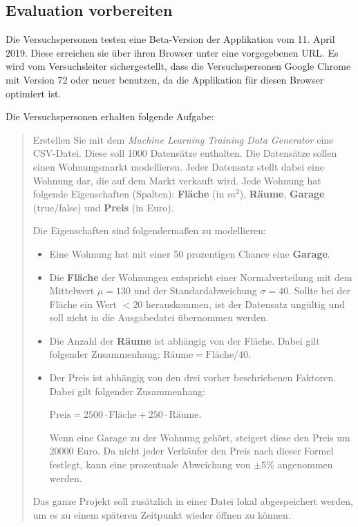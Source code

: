 \subsection{Evaluation vorbereiten}

Die Versuchspersonen testen eine Beta-Version der Applikation vom 11. April 2019. Diese erreichen sie über ihren Browser unter eine vorgegebenen URL. Es wird vom Versuchsleiter sichergestellt, dass die Versuchspersonen Google Chrome mit Version 72 oder neuer benutzen, da die Applikation für diesen Browser optimiert ist.


Die Versuchspersonen erhalten folgende Aufgabe:

\begin{quote}
    
    Erstellen Sie mit dem \textit{Machine Learning Training Data Generator} eine CSV-Datei. Diese soll 1000 Datensätze enthalten. Die Datensätze sollen einen Wohnungsmarkt modellieren. Jeder Datensatz stellt dabei eine Wohnung dar, die auf dem Markt verkauft wird. Jede Wohnung hat folgende Eigenschaften (Spalten): \textbf{Fläche} (in $m^2$), \textbf{Räume}, \textbf{Garage} (true/false) und \textbf{Preis} (in Euro).

    Die Eigenschaften sind folgendermaßen zu modellieren:
    \begin{itemize}
        \item Eine Wohnung hat mit einer 50 prozentigen Chance eine \textbf{Garage}.
        \item Die \textbf{Fläche} der Wohnungen entspricht einer Normalverteilung mit dem Mittelwert $\mu = 130$ und der Standardabweichung $\sigma = 40$. Sollte bei der Fläche ein Wert $< 20$ herauskommen, ist der Datensatz ungültig und soll nicht in die Ausgabedatei übernommen werden.
        \item Die Anzahl der \textbf{Räume} ist abhängig von der Fläche. Dabei gilt folgender Zusammenhang: $\textrm{Räume} = \textrm{Fläche} / 40$.
        \item Der Preis ist abhängig von den drei vorher beschriebenen Faktoren. Dabei gilt folgender Zusammenhang:
        
        $\textrm{Preis} = 2500 \cdot \textrm{Fläche} + 250 \cdot \textrm{Räume}$.
        
        Wenn eine Garage zu der Wohnung gehört, steigert diese den Preis um $20000$ Euro. Da nicht jeder Verkäufer den Preis nach dieser Formel festlegt, kann eine prozentuale Abweichung von $\pm 5\%$ angenommen werden.
    \end{itemize}

    Das ganze Projekt soll zusätzlich in einer Datei lokal abgespeichert werden, um es zu einem späteren Zeitpunkt wieder öffnen zu können.

\end{quote}

